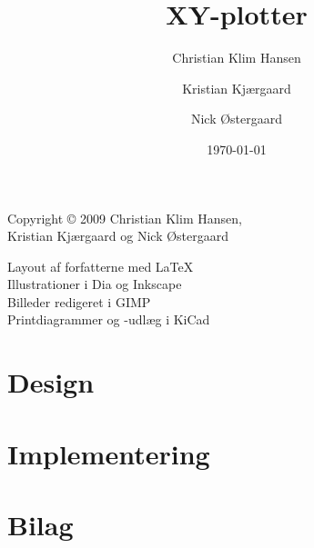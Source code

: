 \documentclass{mypaper}
\title{XY-plotter}
\author{Christian Klim Hansen \and Kristian Kjærgaard \and Nick Østergaard}
\date{\today}
\begin{document}


\setcounter{page}{2}

\strut \vfill { \footnotesize
  \noindent 
  Copyright © 2009 Christian Klim Hansen, \\
  Kristian Kjærgaard og Nick Østergaard

  \medskip

  \noindent
  Layout af forfatterne med \LaTeX\\
  Illustrationer i Dia og Inkscape\\
  Billeder redigeret i GIMP\\
  Printdiagrammer og -udlæg i KiCad
}

\thispagestyle{empty}

\clearpage

\frontmatter

\tableofcontents



\mainmatter




\part{Design}
\label{prt:design}





\part{Implementering}
\label{prt:implementering}





\backmatter




\part{Bilag}
\appendix





\nocite{*}


\label{ch:litteratur}

\listoffigures

\listoftables

\listoffixmes
\end{document}
